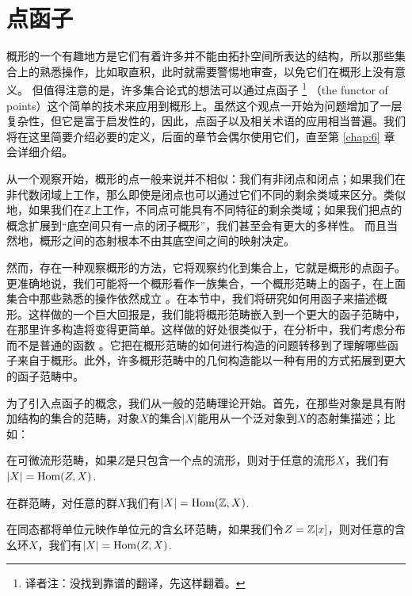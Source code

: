 \section{点函子}

概形的一个有趣地方是它们有着许多并不能由拓扑空间所表达的结构，所以那些集合上的熟悉操作，比如取直积，此时就需要警惕地审查，以免它们在概形上没有意义。 但值得注意的是，许多集合论式的想法可以通过点函子
\footnote{译者注：没找到靠谱的翻译，先这样翻着。}
（the functor of points）这个简单的技术来应用到概形上。虽然这个观点一开始为问题增加了一层复杂性，但它是富于启发性的，因此，点函子以及相关术语的应用相当普遍。我们将在这里简要介绍必要的定义，后面的章节会偶尔使用它们，直至第 \ref{chap:6} 章会详细介绍。

从一个观察开始，概形的点一般来说并不相似：我们有非闭点和闭点；如果我们在非代数闭域上工作，那么即使是闭点也可以通过它们不同的剩余类域来区分。类似地，如果我们在$\mathbb{Z}$上工作，不同点可能具有不同特征的剩余类域；如果我们把点的概念扩展到“底空间只有一点的闭子概形”，我们甚至会有更大的多样性。 而且当然地，概形之间的态射根本不由其底空间之间的映射决定。

然而，存在一种观察概形的方法，它将观察约化到集合上，它就是概形的点函子。更准确地说，我们可能将一个概形看作一族集合，一个概形范畴上的函子，在上面集合中那些熟悉的操作依然成立%
。在本节中，我们将研究如何用函子来描述概形。这样做的一个巨大回报是，我们能将概形范畴嵌入到一个更大的函子范畴中，在那里许多构造将变得更简单。这样做的好处很类似于，在分析中，我们考虑分布而不是普通的函数%
。它把在概形范畴的如何进行构造的问题转移到了理解哪些函子来自于概形。此外，许多概形范畴中的几何构造能以一种有用的方式拓展到更大的函子范畴中。

为了引入点函子的概念，我们从一般的范畴理论开始。首先，在那些对象是具有附加结构的集合的范畴，对象$X$的集合$|X|$能用从一个泛对象到$X$的态射集描述；比如：
\begin{compactenum}[(a)]
\item 在可微流形范畴，如果$Z$是只包含一个点的流形，则对于任意的流形$X$，我们有$|X|=\operatorname{Hom}(Z,X)$.
\item 在群范畴，对任意的群$X$我们有$|X|=\operatorname{Hom}(\mathbb{Z},X)$.
\item 在同态都将单位元映作单位元的含幺环范畴，如果我们令$Z=\mathbb{Z}[x]$，则对任意的含幺环$X$，我们有$|X|=\operatorname{Hom}(Z,X)$.
\end{compactenum}

